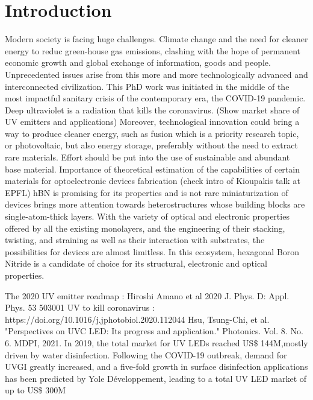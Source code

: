 \chapter*{Introduction}
%
\linenumbers
%
Modern society is facing huge challenges. Climate change and the need for cleaner energy to reduc green-house gas emissions, clashing with the hope of permanent economic growth and global exchange of information, goods and people. Unprecedented issues arise from this more and more technologically advanced and interconnected civilization. This PhD work was initiated in the middle of the most impactful sanitary crisis of the contemporary era, the COVID-19 pandemic. 
Deep ultraviolet is a radiation that kills the coronavirus. (Show market share of UV emitters and applications)
Moreover, technological innovation could bring a way to produce cleaner energy, such as fusion which is a priority research topic, or photovoltaic, but also energy storage, preferably without the need to extract rare materials. Effort should be put into the use of sustainable and abundant base material.
Importance of theoretical estimation of the capabilities of certain materials for optoelectronic devices fabrication (check intro of Kioupakis talk at EPFL)
hBN is promising for its properties and is not rare
miniaturization of devices brings more attention towards heterostructures whose building blocks are single-atom-thick layers. With the variety of optical and electronic properties offered by all the existing monolayers, and the engineering of their stacking, twisting, and straining as well as their interaction with substrates, the possibilities for devices are almost limitless. In this ecosystem, hexagonal Boron Nitride is a candidate of choice for its structural, electronic and optical properties.

The 2020 UV emitter roadmap : Hiroshi Amano et al 2020 J. Phys. D: Appl. Phys. 53 503001
UV to kill coronavirus : https://doi.org/10.1016/j.jphotobiol.2020.112044
Hsu, Tsung-Chi, et al. "Perspectives on UVC LED: Its progress and application." Photonics. Vol. 8. No. 6. MDPI, 2021.
In 2019, the total market for UV LEDs reached US\$ 144M,mostly driven by water disinfection. Following the COVID-19 outbreak, demand for UVGI greatly increased, and a five-fold growth in surface disinfection applications has been predicted by Yole Développement, leading to a total UV LED market of up to US\$ 300M 

